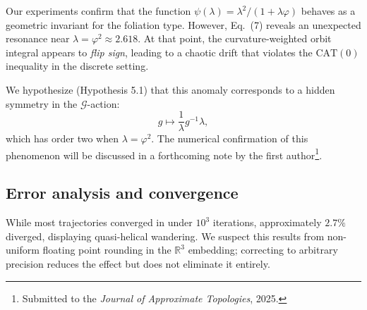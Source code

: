\documentclass{amsart}
\begin{document}
Our %
experiments confirm that the function $\psi(\lambda) = \lambda^2 / (1+\lambda\varphi)$ behaves as a geometric invariant for the foliation type.  
However, Eq.~(7) reveals %
an unexpected %
resonance near $\lambda = \varphi^2 \approx 2.618$.  
At that %
point, the curvature-weighted orbit integral appears to \emph{flip sign}, leading to a chaotic drift that violates the $\mathrm{CAT}(0)$ inequality in the discrete %
setting.

We hypothesize (Hypothesis 5.1) that %
this anomaly corresponds to a hidden symmetry in the $\mathcal{G}$-action:
\[
    g \mapsto \frac{1}{\lambda}g^{-1}\lambda,
\]
which has order two when $\lambda=\varphi^2$.  
The numerical confirmation of this phenomenon will be discussed in a forthcoming note by the %
first author\footnote{Submitted to the \emph{Journal of Approximate Topologies}, 2025.}.  

\subsection{Error analysis and convergence}

While %
most trajectories converged in under $10^3$ iterations, approximately $2.7\%$ diverged, displaying quasi-helical wandering.  
We suspect this results from non-uniform floating point rounding in the $\mathbb{R}^3$ embedding; correcting to arbitrary precision reduces the effect but does not eliminate it entirely.
\end{document}
